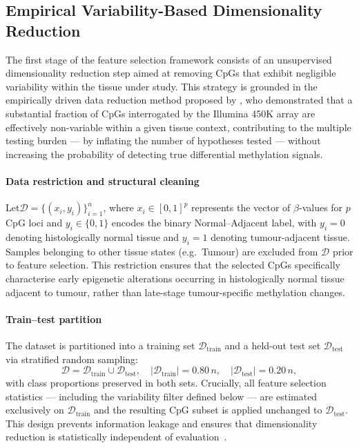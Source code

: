 \subsection{Empirical Variability-Based Dimensionality Reduction}
\label{subsubsec:fs_initial_filter}

The first stage of the feature selection framework consists of an 
unsupervised dimensionality reduction step aimed at removing CpGs 
that exhibit negligible variability within the tissue under study. 
This strategy is grounded in the empirically driven data reduction 
method proposed by \cite{Edgar2017}, who demonstrated that a 
substantial fraction of CpGs interrogated by the Illumina 450K array 
are effectively non-variable within a given tissue context, 
contributing to the multiple testing burden — by inflating the number of
hypotheses tested — without increasing the probability of detecting
true differential methylation signals.

\paragraph{Data restriction and structural cleaning}

Let$\mathcal{D} = \{(x_i, y_i)\}_{i=1}^{n}$,
where $x_i \in [0,1]^p$ represents the vector of $\beta$-values 
for $p$ CpG loci and $y_i \in \{0,1\}$ encodes the binary 
Normal--Adjacent label, with $y_i = 0$ denoting histologically 
normal tissue and $y_i = 1$ denoting tumour-adjacent tissue. 
Samples belonging to other tissue states (e.g.\ Tumour) are 
excluded from $\mathcal{D}$ prior to feature selection. 
This restriction ensures that the selected CpGs specifically 
characterise early epigenetic alterations occurring in 
histologically normal tissue adjacent to tumour, rather than 
late-stage tumour-specific methylation changes.

\paragraph{Train--test partition}

The dataset is partitioned into a training set 
$\mathcal{D}_{\mathrm{train}}$ and a held-out test set 
$\mathcal{D}_{\mathrm{test}}$ via stratified random sampling:
\begin{equation}
    \mathcal{D} = \mathcal{D}_{\mathrm{train}} \cup 
    \mathcal{D}_{\mathrm{test}}, 
    \quad 
    |\mathcal{D}_{\mathrm{train}}| = 0.80\,n, 
    \quad 
    |\mathcal{D}_{\mathrm{test}}| = 0.20\,n,
    \label{eq:split}
\end{equation}
with class proportions preserved in both sets. Crucially, 
all feature selection statistics — including the variability 
filter defined below — are estimated exclusively on 
$\mathcal{D}_{\mathrm{train}}$ and the resulting CpG subset 
is applied unchanged to $\mathcal{D}_{\mathrm{test}}$. This 
design prevents information leakage and ensures that 
dimensionality reduction is statistically independent of 
evaluation~\cite{Ambroise2002}.

